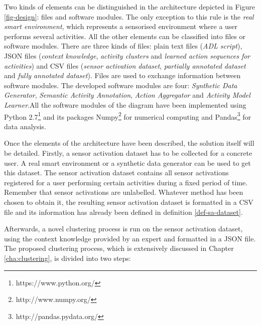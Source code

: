 Two kinds of elements can be distinguished in the architecture depicted in Figure \ref{fig-design}: files and software modules. The only exception to this rule is the \textit{real smart environment}, which represents a sensorised environment where a user performs several activities. All the other elements can be classified into files or software modules. There are three kinds of files: plain text files (\textit{ADL script}), JSON files (\textit{context knowledge}, \textit{activity clusters} and \textit{learned action sequences for activities}) and CSV files (\textit{sensor activation dataset}, \textit{partially annotated dataset} and \textit{fully annotated dataset}). Files are used to exchange information between software modules. The developed software modules are four: \textit{Synthetic Data Generator}, \textit{Semantic Activity Annotation}, \textit{Action Aggregator} and \textit{Activity Model Learner}.All the software modules of the diagram have been implemented using Python 2.7\footnote{https://www.python.org/} and its packages Numpy\footnote{http://www.numpy.org/} for numerical computing and Pandas\footnote{http://pandas.pydata.org/} for data analysis. 

Once the elements of the architecture have been described, the solution itself will be detailed. Firstly, a sensor activation dataset has to be collected for a concrete user. A real smart environment or a synthetic data generator can be used to get this dataset. The sensor activation dataset contains all sensor activations registered for a user performing certain activities during a fixed period of time. Remember that sensor activations are unlabelled. Whatever method has been chosen to obtain it, the resulting sensor activation dataset is formatted in a CSV file and its information has already been defined in definition \ref{def-sa-dataset}.

Afterwards, a novel clustering process is run on the sensor activation dataset, using the context knowledge provided by an expert and formatted in a JSON file. The proposed clustering process, which is extensively discussed in Chapter \ref{cha:clustering}, is divided into two steps: 

